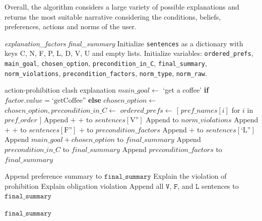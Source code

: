 \documentclass[sigconf,nonacm]{acmart}
\begin{document}
Overall, the algorithm considers a large variety of  possible explanations and returns the most suitable narrative considering the conditions, beliefs, preferences, actions and norms of the user.

\begin{algorithm}
\caption{Generate Natural Language Explanation}
\label{alg:nl_explanation}
\begin{algorithmic}
\Require \textit{explanation\_factors}
\Ensure \textit{final\_summary}
\State Initialize \texttt{sentences} as a dictionary with keys C, N, F, P, L, D, V, U and empty lists.\;
\State Initialize variables: \texttt{ordered\_prefs}, \texttt{main\_goal}, \texttt{chosen\_option}, \texttt{precondition\_in\_C}, \texttt{final\_summary}, \texttt{norm\_violations}, \texttt{precondition\_factors}, \texttt{norm\_type}, \texttt{norm\_raw}.\;

    \Return action-prohibition clash explanation\;
\Else
{}
        \State $main\_goal \gets$ `get a coffee' \textbf{if} $factor.value = \text{`getCoffee''}$ \textbf{else} $chosen\_option \gets$ \;
     \State $chosen\_option, precondition\_in\_C \gets$ \;
     \State $ordered\_prefs \gets$ [ $pref\_names[i]$ for $i$ in $pref\_order$ ]\;
     \State Append  $+$ $+$  to $sentences[\text{V''}]$\;
     \State Append  to $norm\_violations$\;
     \State Append  $+$  $+$ to $sentences[\text{F''}]$\;
     \State {} $+$  to $precondition\_factors$\;
     \State Append  $+$  to $sentences[\text{`L''}]$\;
    \EndIf
\EndFor
{} \State Append $main\_goal + chosen\_option$ to $final\_summary$\; \EndIf
{} \State Append $precondition\_in\_C$ to $final\_summary$\; \EndIf
\State Append $precondition\_factors$ to $final\_summary$\;

 \State Append preference summary to $\texttt{final\_summary}$\; \EndIf
{}
     \State Explain the violation of prohibition\;
     \State Explain obligation violation\;
    \EndIf
\EndIf
\State Append all $\texttt{V}$, $\texttt{F}$, and $\texttt{L}$ sentences to $\texttt{final\_summary}$\;

\Return $\texttt{final\_summary}$\;
\end{algorithmic}
\end{algorithm}
\end{document}
